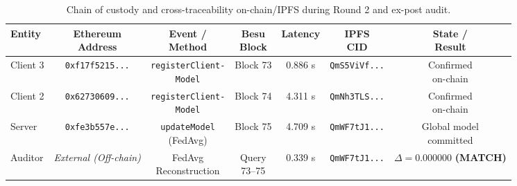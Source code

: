 \begin{table}[htbp]
\caption{Chain of custody and cross-traceability on-chain/IPFS during Round 2 and ex-post audit.}\label{tab:trazabilidad_ronda2}
\footnotesize
\setlength{\tabcolsep}{3pt}
\renewcommand{\arraystretch}{1.2}
\begin{tabular*}{\textwidth}{@{\extracolsep\fill}lcccccc}
\toprule
\textbf{Entity} & \makecell{\textbf{Ethereum}\\\textbf{Address}} & \makecell{\textbf{Event /}\\\textbf{Method}} & \makecell{\textbf{Besu}\\\textbf{Block}} & \textbf{Latency} & \makecell{\textbf{IPFS}\\\textbf{CID}} & \makecell{\textbf{State /}\\\textbf{Result}} \\
\midrule
Client 3 & \texttt{0xf17f5215...} & \makecell[c]{\texttt{registerClient-}\\\texttt{Model}} & Block 73 & 0.886 s & \texttt{QmS5ViVf...} & \makecell[c]{Confirmed\\on-chain} \\
Client 2 & \texttt{0x62730609...} & \makecell[c]{\texttt{registerClient-}\\\texttt{Model}} & Block 74 & 4.311 s & \texttt{QmNh3TLS...} & \makecell[c]{Confirmed\\on-chain} \\
Server  & \texttt{0xfe3b557e...} & \makecell[c]{\texttt{updateModel}\\(FedAvg)} & Block 75 & 4.709 s & \texttt{QmWF7tJ1...} & \makecell[c]{Global model\\committed} \\
\midrule
Auditor & \textit{External (Off-chain)} & \makecell[c]{FedAvg\\Reconstruction} & \makecell[c]{Query\\73--75} & 0.339 s & \texttt{QmWF7tJ1...} & \makecell[c]{\textbf{$\Delta = 0.000000$}\\\textbf{(MATCH)}} \\
\bottomrule
\end{tabular*}
\end{table}

